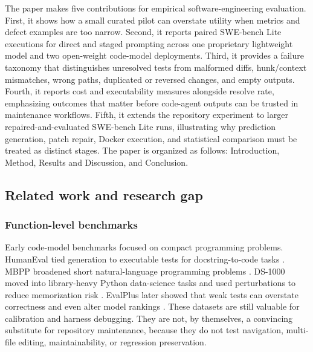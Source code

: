 \documentclass[preprint,12pt]{elsarticle}
\begin{document}
The paper makes five contributions for empirical software-engineering evaluation. First, it shows how a small curated pilot can overstate utility when metrics and defect examples are too narrow. Second, it reports paired SWE-bench Lite executions for direct and staged prompting across one proprietary lightweight model and two open-weight code-model deployments. Third, it provides a failure taxonomy that distinguishes unresolved tests from malformed diffs, hunk/context mismatches, wrong paths, duplicated or reversed changes, and empty outputs. Fourth, it reports cost and executability measures alongside resolve rate, emphasizing outcomes that matter before code-agent outputs can be trusted in maintenance workflows. Fifth, it extends the repository experiment to larger repaired-and-evaluated SWE-bench Lite runs, illustrating why prediction generation, patch repair, Docker execution, and statistical comparison must be treated as distinct stages. The paper is organized as follows: Introduction, Method, Results and Discussion, and Conclusion.

\subsection{Related work and research gap}

\subsubsection{Function-level benchmarks}
Early code-model benchmarks focused on compact programming problems. HumanEval tied generation to executable tests for docstring-to-code tasks \cite{chen2021codex}. MBPP broadened short natural-language programming problems \cite{austin2021mbpp}. DS-1000 moved into library-heavy Python data-science tasks and used perturbations to reduce memorization risk \cite{lai2022ds1000}. EvalPlus later showed that weak tests can overstate correctness and even alter model rankings \cite{liu2023evalplus}. These datasets are still valuable for calibration and harness debugging. They are not, by themselves, a convincing substitute for repository maintenance, because they do not test navigation, multi-file editing, maintainability, or regression preservation.
\end{document}
